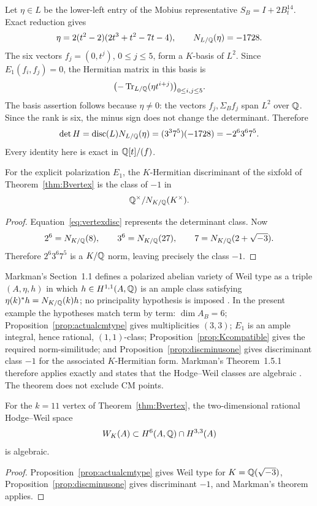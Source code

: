 Let $\eta\in L$ be the lower-left entry of the Mobius representative $S_B=I+2B_t^{14}$. Exact reduction gives
\[
 \eta=2(t^2-2)(2t^3+t^2-7t-4),\qquad N_{L/\mathbb Q}(\eta)=-1728.
\]
The six vectors $f_j=(0,t^j)$, $0\le j\le5$, form a $K$-basis of $L^2$. Since $E_1(f_i,f_j)=0$, the Hermitian matrix in this basis is
\[
 \bigl(-\operatorname{Tr}_{L/\mathbb Q}(\eta t^{i+j})\bigr)_{0\le i,j\le5}.
\]
The basis assertion follows because $\eta\ne0$: the vectors $f_j,\Sigma_Bf_j$ span $L^2$ over $\mathbb Q$. Since the rank is six, the minus sign does not change the determinant. Therefore
\begin{equation}\label{eq:vertexdisc}
 \det H=\operatorname{disc}(L)N_{L/\mathbb Q}(\eta)
 =(3^3 7^5)(-1728)=-2^6 3^6 7^5.
\end{equation}
Every identity here is exact in $\mathbb Q[t]/(f)$.

\begin{proposition}\label{prop:discminusone}
For the explicit polarization $E_1$, the $K$-Hermitian discriminant of the sixfold of Theorem~\ref{thm:Bvertex} is the class of $-1$ in
\[
 \mathbb Q^\times/N_{K/\mathbb Q}(K^\times).
\]
\end{proposition}
\begin{proof}
Equation~\eqref{eq:vertexdisc} represents the determinant class. Now
\[
 2^6=N_{K/\mathbb Q}(8),\qquad 3^6=N_{K/\mathbb Q}(27),\qquad 7=N_{K/\mathbb Q}(2+\sqrt{-3}).
\]
Therefore $2^6 3^6 7^5$ is a $K/\mathbb Q$ norm, leaving precisely the class $-1$.
\end{proof}

Markman's Section~1.1 defines a polarized abelian variety of Weil type as a triple $(A,\eta,h)$ in which $h\in H^{1,1}(A,\mathbb Q)$ is an ample class satisfying $\eta(k)^*h=N_{K/\mathbb Q}(k)h$; no principality hypothesis is imposed \cite[Sec.~1.1]{Markman2025}.  In the present example the hypotheses match term by term: $\dim A_B=6$; Proposition~\ref{prop:actualcmtype} gives multiplicities $(3,3)$; $E_1$ is an ample integral, hence rational, $(1,1)$-class; Proposition~\ref{prop:Kcompatible} gives the required norm-similitude; and Proposition~\ref{prop:discminusone} gives discriminant class $-1$ for the associated $K$-Hermitian form.  Markman's Theorem~1.5.1 therefore applies exactly and states that the Hodge--Weil classes are algebraic \cite[Thm.~1.5.1]{Markman2025}.  The theorem does not exclude CM points.

\begin{corollary}\label{cor:Weilalg}
For the $k=11$ vertex of Theorem~\ref{thm:Bvertex}, the two-dimensional rational Hodge--Weil space
\[
 W_K(A)\subset H^6(A,\mathbb Q)\cap H^{3,3}(A)
\]
is algebraic.
\end{corollary}
\begin{proof}
Proposition~\ref{prop:actualcmtype} gives Weil type for $K=\mathbb Q(\sqrt{-3})$, Proposition~\ref{prop:discminusone} gives discriminant $-1$, and Markman's theorem applies.
\end{proof}


